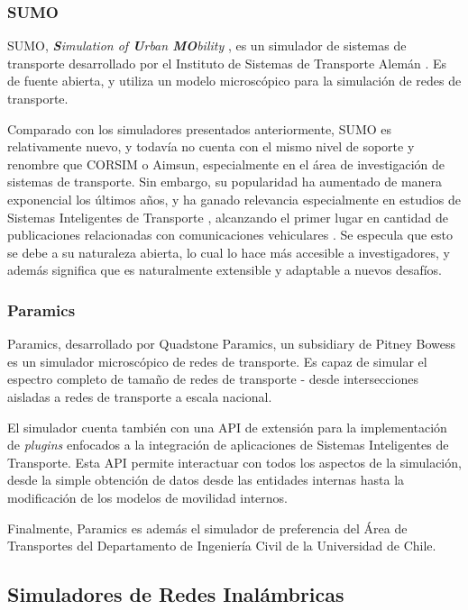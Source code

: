 \subsubsection{SUMO}

SUMO, \emph{\textbf{S}imulation of \textbf{U}rban \textbf{MO}bility} \autocite{sumo}, es un simulador de sistemas de transporte desarrollado por el Instituto de Sistemas de Transporte Alemán \autocite{dlr}. 
Es de fuente abierta, y utiliza un modelo microscópico para la simulación de redes de transporte.

Comparado con los simuladores presentados anteriormente, SUMO es relativamente nuevo, y todavía no cuenta con el mismo nivel de soporte y renombre que CORSIM o Aimsun, especialmente en el área de investigación de sistemas de transporte. Sin embargo, su popularidad ha aumentado de manera exponencial los últimos años, y ha ganado relevancia especialmente en estudios de Sistemas Inteligentes de Transporte \autocite{sumo-popularity}, alcanzando el primer lugar en cantidad de publicaciones relacionadas con comunicaciones vehiculares \autocite{sumo-popularity2}. Se especula que esto se debe a su naturaleza abierta, lo cual lo hace más accesible a investigadores, y además significa que es naturalmente extensible y adaptable a nuevos desafíos.

\subsubsection{Paramics}

Paramics, desarrollado por Quadstone Paramics, un subsidiary de Pitney Bowess \autocite{paramics} es un simulador microscópico de redes de transporte. Es capaz de simular el espectro completo de tamaño de redes de transporte - desde intersecciones aisladas a redes de transporte a escala nacional.

El simulador cuenta también con una API de extensión para la implementación de \emph{plugins} enfocados a la integración de aplicaciones de Sistemas Inteligentes de Transporte. Esta API permite interactuar con todos los aspectos de la simulación, desde la simple obtención de datos desde las entidades internas hasta la modificación de los modelos de movilidad internos.

Finalmente, Paramics es además el simulador de preferencia del Área de Transportes del Departamento de Ingeniería Civil de la Universidad de Chile.

\subsection{Simuladores de Redes Inalámbricas}

